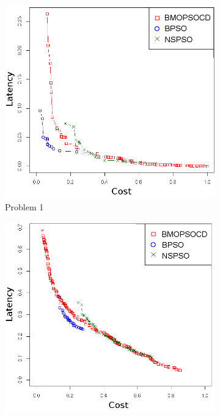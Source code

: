 \begin{figure}[]
   \caption{MOPSOCD, NSPSO and BPSO Experiments: The non-dominated solutions
among the sets obtained by 40 independent runs of different algorithms}
   \centering
   \begin{subfigure}{0.30\textwidth}
       \includegraphics[width=\textwidth]{pics/total1.png}
	   \caption{Problem 1}
   \end{subfigure}
   \begin{subfigure}{0.30\textwidth}
       \includegraphics[width=\textwidth]{pics/total2.png}

\end{subfigure}
\end{figure}
